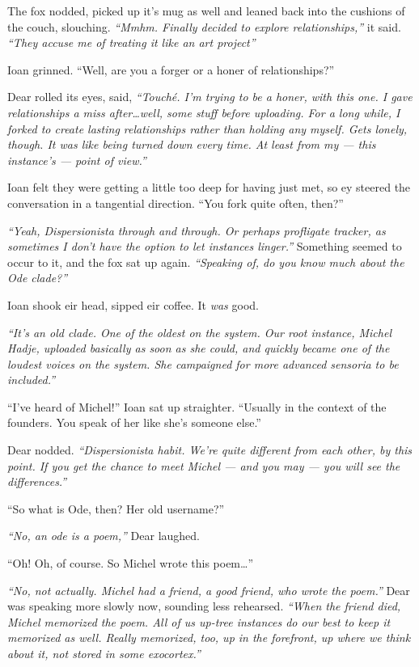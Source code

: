 The fox nodded, picked up it's mug as well and leaned back into the cushions of the couch, slouching. \emph{``Mmhm. Finally decided to explore relationships,''} it said. \emph{``They accuse me of treating it like an art project''}

Ioan grinned. ``Well, are you a forger or a honer of relationships?''

Dear rolled its eyes, said, \emph{``Touché. I'm trying to be a honer, with this one. I gave relationships a miss after\ldots{}well, some stuff before uploading. For a long while, I forked to create lasting relationships rather than holding any myself. Gets lonely, though. It was like being turned down every time. At least from my — this instance's — point of view.''}

Ioan felt they were getting a little too deep for having just met, so ey steered the conversation in a tangential direction. ``You fork quite often, then?''

\emph{``Yeah, Dispersionista through and through. Or perhaps profligate tracker, as sometimes I don't have the option to let instances linger.''} Something seemed to occur to it, and the fox sat up again. \emph{``Speaking of, do you know much about the Ode clade?''}

Ioan shook eir head, sipped eir coffee. It \emph{was} good.

\emph{``It's an old clade. One of the oldest on the system. Our root instance, Michel Hadje, uploaded basically as soon as she could, and quickly became one of the loudest voices on the system. She campaigned for more advanced sensoria to be included.''}

``I've heard of Michel!'' Ioan sat up straighter. ``Usually in the context of the founders. You speak of her like she's someone else.''

Dear nodded. \emph{``Dispersionista habit. We're quite different from each other, by this point. If you get the chance to meet Michel — and you may — you will see the differences.''}

``So what is Ode, then? Her old username?''

\emph{``No, an ode is a poem,''} Dear laughed.

``Oh! Oh, of course. So Michel wrote this poem\ldots{}''

\emph{``No, not actually. Michel had a friend, a good friend, who wrote the poem.''} Dear was speaking more slowly now, sounding less rehearsed. \emph{``When the friend died, Michel memorized the poem. All of us up-tree instances do our best to keep it memorized as well. Really memorized, too, up in the forefront, up where we think about it, not stored in some exocortex.''}

